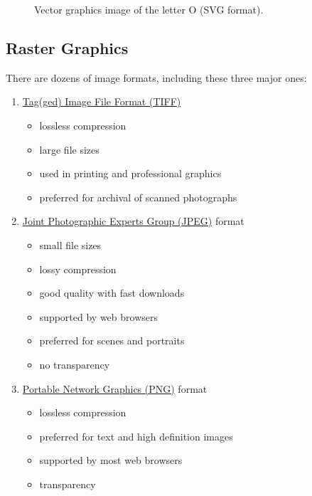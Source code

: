 \documentclass[
  a4paper,
]{article}
\providecommand{\tightlist}{%
  \setlength{\itemsep}{0pt}\setlength{\parskip}{0pt}}
\begin{document}
\begin{figure}
\hypertarget{fig:vector}{%
\centering

\caption{Vector graphics image of the letter O (SVG
format).}\label{fig:vector}
}
\end{figure}

\hypertarget{raster-graphics}{%
\subsection{Raster Graphics}\label{raster-graphics}}

There are dozens of image formats, including these three major ones:

\begin{enumerate}
\tightlist
\item
  \href{https://en.wikipedia.org/wiki/TIFF}{Tag(ged) Image File Format
  (TIFF)}

  \begin{itemize}
  \tightlist
  \item
    lossless compression
  \item
    large file sizes
  \item
    used in printing and professional graphics
  \item
    preferred for archival of scanned photographs
  \end{itemize}
\item
  \href{https://jpeg.org/about.html}{Joint Photographic Experts Group
  (JPEG)} format

  \begin{itemize}
  \tightlist
  \item
    small file sizes
  \item
    lossy compression
  \item
    good quality with fast downloads
  \item
    supported by web browsers
  \item
    preferred for scenes and portraits
  \item
    no transparency
  \end{itemize}
\item
  \href{http://www.libpng.org/pub/png/}{Portable Network Graphics (PNG)}
  format

  \begin{itemize}
  \tightlist
  \item
    lossless compression
  \item
    preferred for text and high definition images
  \item
    supported by most web browsers
  \item
    transparency
  \end{itemize}
\end{enumerate}
\end{document}
